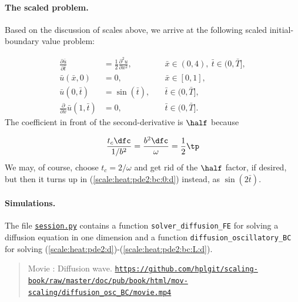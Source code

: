 \documentclass[graybox,envcountchap,sectrefs,final]{svmonodo}
\newenvironment{doconce:movie}{}{}
\newcounter{doconce:movie:counter}
\begin{document}
\paragraph{The scaled problem.}
Based on the discussion of scales above, we arrive at the following
scaled initial-boundary value problem:

\begin{align}
\frac{\partial \bar u}{\partial \bar t} &=
\frac{1}{2}\frac{\partial^2 u}{\partial x^2},
\quad & \bar x\in (0,4),\ \bar t\in (0,\bar T],
\label{scale:heat:pde2:d}\\ 
\bar u(\bar x,0) &= 0,
\quad &\bar x\in [0,1],
\label{scale:heat:pde2:ic:u:d}\\ 
\bar u(0,\bar t) & = \sin(\bar t),
\quad  &\bar t\in (0,\bar T],
\label{scale:heat:pde2:bc:0:d}\\ 
\frac{\partial}{\partial\bar x}\bar u(1,\bar t) & = 0,
\quad &\bar t\in (0,\bar T].
\label{scale:heat:pde2:bc:L:d}
\end{align}
The coefficient in front of the second-derivative is $\half$ because

\[ \frac{t_c\dfc}{1/b^2} = \frac{b^2\dfc}{\omega}
= \frac{1}{2}\tp\]
We may, of course, choose $t_c=2/\omega$ and get rid of the $\half$ factor,
if desired, but then it turns up in (\ref{scale:heat:pde2:bc:0:d}) instead,
as $\sin (2\bar t)$.

\paragraph{Simulations.}
The file \href{{http://tinyurl.com/o8pb3yy/session.py}}{\nolinkurl{session.py}} contains a function
\Verb!solver_diffusion_FE! for solving a diffusion equation in one dimension
and a function \Verb!diffusion_oscillatory_BC! for solving
(\ref{scale:heat:pde2:d})-(\ref{scale:heat:pde2:bc:L:d}).


\begin{doconce:movie}
\begin{quote}
Movie : Diffusion wave. \href{https://github.com/hplgit/scaling-book/raw/master/doc/pub/book/html/mov-scaling/diffusion_osc_BC/movie.mp4}{\nolinkurl{https://github.com/hplgit/scaling-book/raw/master/doc/pub/book/html/mov-scaling/diffusion_osc_BC/movie.mp4}}
\end{quote}
\end{doconce:movie}
\end{document}
